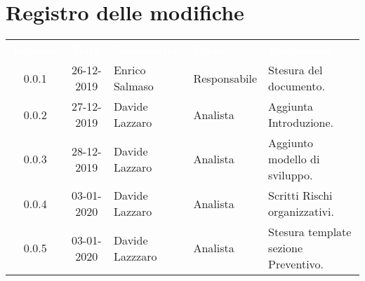 \section*{Registro delle modifiche}
{
\renewcommand{\arraystretch}{1.5}
\centering
\begin{longtable}{ c c  C{4cm}  C{3cm} C{4cm}}
\textcolor{white}{\textbf{Versione}} & \textcolor{white}{\textbf{Data}} & \textcolor{white}{\textbf{Nominativo}} & \textcolor{white}{\textbf{Ruolo}} & \textcolor{white}{\textbf{Descrizione}}\\	


0.0.1 & 26-12-2019 & Enrico Salmaso & Responsabile & Stesura del documento.  \\	
0.0.2 & 27-12-2019 & Davide Lazzaro & Analista & Aggiunta Introduzione. \\
0.0.3 & 28-12-2019 & Davide Lazzaro & Analista & Aggiunto modello di sviluppo.\\	
0.0.4 & 03-01-2020 & Davide Lazzaro & Analista & Scritti Rischi organizzativi. \\
0.0.5 & 03-01-2020 & Davide Lazzzaro & Analista & Stesura template sezione Preventivo.\\
		
\end{longtable}
}